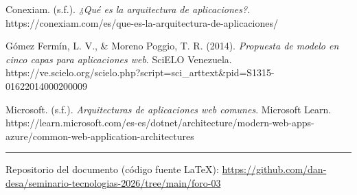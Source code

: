 \documentclass[
  spanish,
  12pt,
  letterpaper,
]{article}
\begin{document}
Conexiam. (s.f.). \emph{¿Qué es la arquitectura de aplicaciones?}.
https://conexiam.com/es/que-es-la-arquitectura-de-aplicaciones/

Gómez Fermín, L. V., \& Moreno Poggio, T. R. (2014). \emph{Propuesta de
modelo en cinco capas para aplicaciones web}. SciELO Venezuela.
https://ve.scielo.org/scielo.php?script=sci\_arttext\&pid=S1315-01622014000200009

Microsoft. (s.f.). \emph{Arquitecturas de aplicaciones web comunes}.
Microsoft Learn.
https://learn.microsoft.com/es-es/dotnet/architecture/modern-web-apps-azure/common-web-application-architectures

\begin{center}\rule{0.5\linewidth}{0.5pt}\end{center}

Repositorio del documento (código fuente LaTeX):
\url{https://github.com/dan-desa/seminario-tecnologias-2026/tree/main/foro-03}
\end{document}
